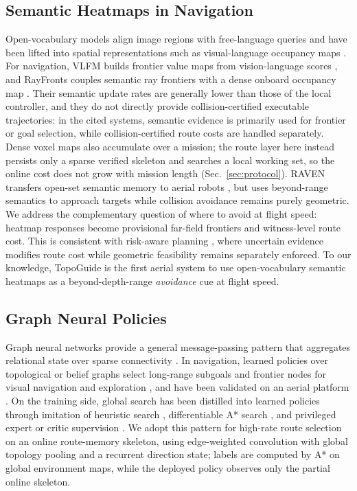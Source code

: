 \documentclass[letterpaper,10pt,conference]{ieeeconf}
\begin{document}
\subsection{Semantic Heatmaps in Navigation}
Open-vocabulary models align image regions with free-language queries
\cite{clip,openseg,pearl} and have been lifted into spatial
representations such as visual-language occupancy maps
\cite{vlmaps}.  For navigation, VLFM
builds frontier value maps from vision-language scores \cite{vlfm},
and RayFronts couples semantic ray frontiers with a dense onboard
occupancy map \cite{rayfronts}.  Their semantic update rates are
generally lower than those of the local controller, and they do not
directly provide collision-certified executable trajectories: in the
cited systems, semantic evidence is primarily used for frontier or
goal selection, while collision-certified route costs are handled
separately.  Dense voxel maps also accumulate over a mission; the
route layer here instead persists only a sparse verified skeleton and
searches a local working set, so the online cost does not grow with
mission length (Sec.~\ref{sec:protocol}).  RAVEN transfers open-set
semantic memory to aerial robots
\cite{raven}, but uses beyond-range semantics to approach targets while
collision avoidance remains purely geometric.
We
address the complementary question of where to avoid at flight speed:
heatmap responses become provisional far-field frontiers and
witness-level route cost.  This is consistent with risk-aware
planning \cite{blackmore}, where uncertain evidence modifies route
cost while geometric feasibility remains separately enforced.
To our knowledge, TopoGuide is the first aerial system to use
open-vocabulary semantic heatmaps as a beyond-depth-range \emph{avoidance}
cue at flight speed.

\subsection{Graph Neural Policies}
Graph neural networks provide a general message-passing pattern that
aggregates relational state over sparse connectivity \cite{kipf2017gcn}.
In navigation, learned policies over topological or
belief graphs select long-range subgoals and frontier nodes for visual
navigation and exploration
\cite{chaplot2020ntslam,chen2020gnnexplore,cao2023ariadne}, and have
been validated on an aerial platform \cite{herrera2023gnnexplore}.
On the training side, global search has been distilled into learned
policies through imitation of heuristic search \cite{bhardwaj2017imitation},
differentiable A* search \cite{yonetani2021neuralastar}, and
privileged expert or critic supervision \cite{loquercio,cao2024largescale}.
We adopt this pattern for high-rate route selection on an online
route-memory skeleton, using edge-weighted convolution with global
topology pooling and a recurrent direction state; labels are computed
by A* on global environment maps, while the deployed policy observes
only the partial online skeleton.
\end{document}
